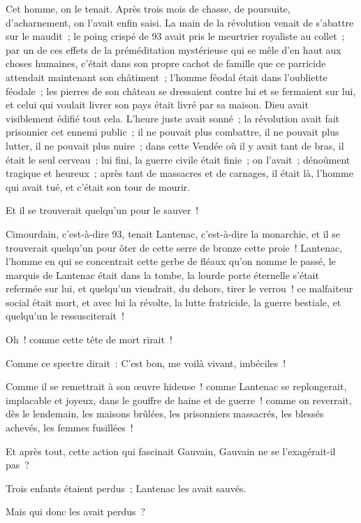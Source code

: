 \documentclass[french,twoside]{book} %
\begin{document}
Cet homme, on le tenait. Après trois mois de chasse, de poursuite, d’acharnement, on l’avait enfin saisi. La main de la révolution venait de s’abattre sur le maudit ; le poing crispé de 93 avait pris le meurtrier royaliste au collet ; par un de ces effets de la préméditation mystérieuse qui se mêle d’en haut aux choses humaines, c’était dans son propre cachot de famille que ce parricide attendait maintenant son châtiment ;  l’homme féodal était dans l’oubliette féodale ; les pierres de son château se dressaient contre lui et se fermaient sur lui, et celui qui voulait livrer son pays était livré par sa maison. Dieu avait visiblement édifié tout cela. L’heure juste avait sonné ; la révolution avait fait prisonnier cet ennemi public ; il ne pouvait plus combattre, il ne pouvait plus lutter, il ne pouvait plus nuire ; dans cette Vendée où il y avait tant de bras, il était le seul cerveau ; lui fini, la guerre civile était finie ; on l’avait ; dénoûment tragique et heureux ; après tant de massacres et de carnages, il était là, l’homme qui avait tué, et c’était son tour de mourir.\par
Et il se trouverait quelqu’un pour le sauver !\par
Cimourdain, c’est-à-dire 93, tenait Lantenac, c’est-à-dire la monarchie, et il se trouverait quelqu’un pour ôter de cette serre de bronze cette proie ! Lantenac, l’homme en qui se concentrait cette gerbe de fléaux qu’on nomme le passé, le marquis de Lantenac était dans la tombe, la lourde porte éternelle s’était refermée sur lui, et quelqu’un viendrait, du dehors, tirer le verrou ! ce malfaiteur social était mort, et avec lui la révolte, la lutte fratricide, la guerre bestiale, et quelqu’un le ressusciterait !\par
Oh ! comme cette tête de mort rirait !\par
Comme ce spectre dirait : C’est bon, me voilà vivant, imbéciles !\par
Comme il se remettrait à son œuvre hideuse ! comme Lantenac se replongerait, implacable et joyeux, dans le gouffre de haine et de guerre ! comme on reverrait, dès le lendemain, les maisons brûlées, les  prisonniers massacrés, les blessés achevés, les femmes fusillées !\par
Et après tout, cette action qui fascinait Gauvain, Gauvain ne se l’exagérait-il pas ?\par
Trois enfants étaient perdus ; Lantenac les avait sauvés.\par
Mais qui donc les avait perdus ?\par
\end{document}
